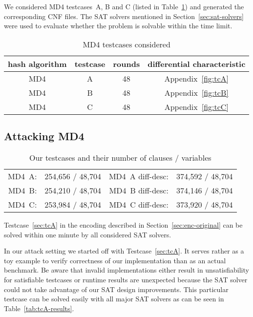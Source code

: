 We considered MD4 testcases~A, B and C (listed in Table~\ref{tab:md4-tcs})
and generated the corresponding CNF files. The SAT solvers mentioned
in Section~\ref{sec:sat-solvers} were used to evaluate whether the problem
is solvable within the time limit.

\begin{table}
  \begin{center}
    \begin{tabular}{cccc}
      \textbf{hash algorithm} & \textbf{testcase} & \textbf{rounds} & \textbf{differential characteristic} \\
    \hline
      MD4                     & A                 & 48              & Appendix~\ref{fig:tcA} \\
      MD4                     & B                 & 48              & Appendix~\ref{fig:tcB} \\
      MD4                     & C                 & 48              & Appendix~\ref{fig:tcC} \\
    \end{tabular}
    \caption{MD4 testcases considered}
    \label{tab:md4-tcs}
  \end{center}
\end{table}

\subsection{Attacking MD4}
\label{sec:results-md4}
%
\begin{table}[!h]
  \begin{center}
    \begin{tabular}{rc|rc}
      MD4~A: & 254,656 / 48,704 & MD4~A diff-desc: & 374,592 / 48,704 \\
      MD4~B: & 254,210 / 48,704 & MD4~B diff-desc: & 374,146 / 48,704 \\
      MD4~C: & 253,984 / 48,704 & MD4~C diff-desc: & 373,920 / 48,704 \\
    \end{tabular}
    \caption{Our testcases and their number of clauses / variables}
  \end{center}
\end{table}
\begin{prop}
  Testcase~\ref{sec:tcA} in the encoding described in Section~\ref{sec:enc-original}
  can be solved within one minute by all considered SAT solvers.
\end{prop}

In our attack setting we started off with Testcase~\ref{sec:tcA}. It serves
rather as a toy example to verify correctness of our implementation than
as an actual benchmark. Be aware that invalid implementations either
result in unsatisfiability for satisfiable testcases or runtime results are
unexpected because the SAT solver could not take advantage of our SAT design
improvements. This particular testcase can be solved easily with all major
SAT solvers as can be seen in Table~\ref{tab:tcA-results}.

